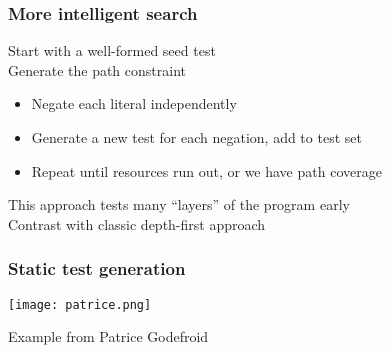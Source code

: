 \documentclass[10pt,xcolor={dvipsnames}]{beamer}
\begin{document}
\begin{frame}

\frametitle{More intelligent search}

Start with a well-formed seed test
\\[1em]

\pause
Generate the path constraint
\begin{itemize}
\item Negate each literal independently \\[0.5em]
\item Generate a new test for each negation, add to test set \\[0.5em]
\item Repeat until resources run out, or we have path coverage \\[1.5em]
\end{itemize}

\pause
This approach tests many ``layers'' of the program early
\\[1em]

Contrast with classic depth-first approach

\end{frame}


\begin{frame}

\frametitle{Static test generation}

\texttt{[image: patrice.png]}

\vspace*{1em}
\vfill

{\small
Example from Patrice Godefroid
}

\end{frame}

\end{document}
